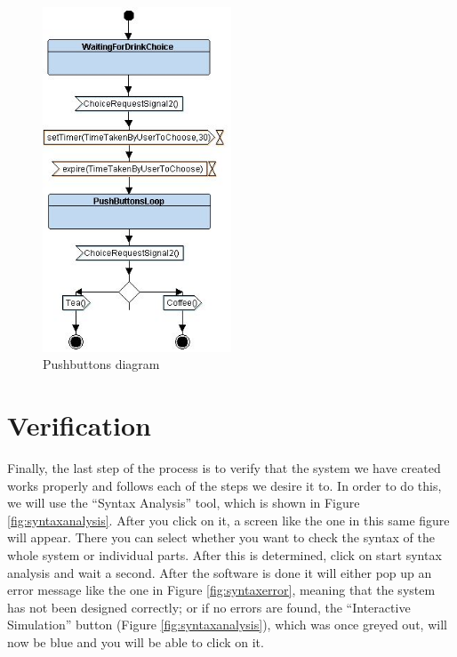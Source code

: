 \documentclass[12pt]{article}
\begin{document}
\begin{figure}[htbp]
\centering
\includegraphics[width=0.5\textwidth]{fig/pushdiagram.jpg}
\caption{Pushbuttons diagram} \label{fig:pushbuttondiagram}
\end{figure}

\section{Verification}
	Finally, the last step of the process is to verify that the system we have created works properly and follows each of the steps we desire it to. In order to do this, we will use the “Syntax Analysis” tool, which is shown in Figure \ref{fig:syntaxanalysis}. After you click on it, a screen like the one in this same figure will appear. There you can select whether you want to check the syntax of the whole system or individual parts. After this is determined, click on start syntax analysis and wait a second. After the software is done it will either pop up an error message like the one in Figure \ref{fig:syntaxerror}, meaning that the system has not been designed correctly; or if no errors are found, the “Interactive Simulation” button (Figure \ref{fig:syntaxanalysis}), which was once greyed out, will now be blue and you will be able to click on it.
\end{document}
